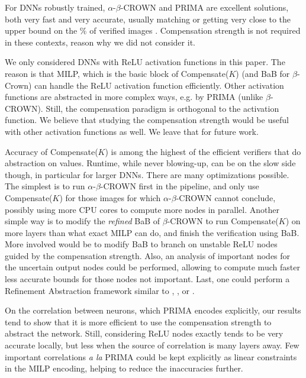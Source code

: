 \documentclass{llncs}
\begin{document}
For DNNs robustly trained, $\alpha$-$\beta$-CROWN and PRIMA are excellent solutions, both very fast and very accurate, usually matching or getting very close \cite{crown} to the upper bound on the $\%$ of verified images \cite{attack}. Compensation strength is not required in these contexts, reason why we did not consider it.

We only considered DNNs with ReLU activation functions in this paper. The reason is that MILP, which is the basic block of Compensate($K$) (and BaB for $\beta$-Crown) can handle the ReLU activation function efficiently. Other activation functions are abstracted in more complex ways, e.g. by PRIMA (unlike $\beta$-CROWN). Still, the compensation paradigm is  orthogonal to the activation function. We believe that studying the compensation strength would be useful with other activation functions as well. We leave that for future work. 

Accuracy of Compensate($K$) is among the highest of the efficient verifiers that do abstraction on values. Runtime, while never blowing-up, can be on the slow side though, in particular for larger DNNs. There are many optimizations possible. The simplest is to run $\alpha$-$\beta$-CROWN first in the pipeline, and only use Compensate($K$) for those images for which $\alpha$-$\beta$-CROWN cannot conclude, possibly using more CPU cores to compute more nodes in parallel. Another simple way is to modify the {\em refined} BaB of $\beta$-CROWN to run Compensate($K$) on more layers than what exact MILP can do, and finish the verification using BaB. More involved would be to modify BaB to branch on unstable ReLU nodes guided by the compensation strength. Also, an analysis of important nodes for the uncertain output nodes could be performed, allowing to compute much faster less accurate bounds for those nodes not important. Last, one could perform a Refinement Abstraction framework similar to \cite{atva}, \cite{elboher}, or \cite{SRGR}.

On the correlation between neurons, which PRIMA encodes explicitly, our results tend to show that it is more efficient to use the compensation strength to abstract the network. Still, considering ReLU nodes exactly tends to be very accurate locally, but less when the source of correlation is many layers away. Few important correlations {\em a la} PRIMA could be kept explicitly as linear constraints in the MILP encoding, helping to reduce the inaccuracies further.




\vspace{-0.2cm}
\end{document}
